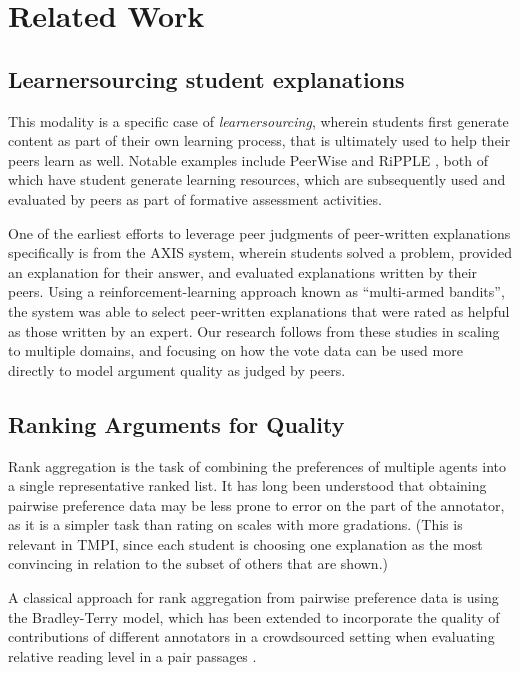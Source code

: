 \documentclass[sigconf]{acmart}
\begin{document}
\section{Related Work}

\subsection{Learnersourcing student explanations}
This modality is a specific case of  
\textit{learnersourcing}\cite{weir_learnersourcing_2015}, wherein students first
generate content as part of their own learning process, that is ultimately used 
to help their peers learn as well.
Notable examples include PeerWise \cite{denny_peerwise:_2008} and RiPPLE 
\cite{khosravi_ripple_2019}, both of which have student generate learning 
resources, which are subsequently used and evaluated by peers as part of 
formative assessment activities.

One of the earliest efforts to leverage peer judgments of peer-written 
explanations specifically is from the AXIS system\cite{williams_axis:_2016}, 
wherein students solved a problem, provided an explanation for their answer, 
and evaluated explanations written by their peers.
Using a reinforcement-learning approach known as ``multi-armed bandits'', the 
system was able to select peer-written explanations that were rated as helpful 
as those written by an expert.
Our research follows from these studies in scaling to multiple domains, and 
focusing on how the vote data can be used more directly to model argument 
quality as judged by peers.

\subsection{Ranking Arguments for Quality}
Rank aggregation is the task of combining the preferences of multiple agents 
into a single representative ranked list.
It has long been understood that obtaining pairwise preference data may be 
less prone to error on the part of the annotator, as it is a simpler task than 
rating on scales with more gradations. 
(This is relevant in TMPI, since each student is choosing one explanation as 
the most convincing in relation to the subset of others that are shown.)
 
A classical approach for rank aggregation from pairwise preference data is 
using the Bradley-Terry model, which has been extended to incorporate the 
quality of contributions of different annotators in a crowdsourced setting when 
evaluating relative reading level in a pair passages \cite{chen_pairwise_2013}. 
\end{document}
